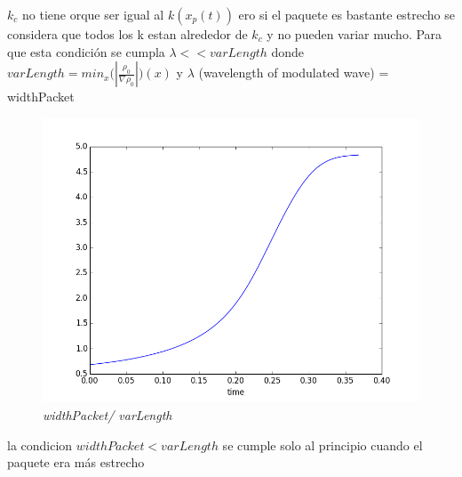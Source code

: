 \documentclass{article}
\begin{document}
\begin{description}
\item $k_c$ no tiene orque ser igual al $k(x_p(t))$ ero si el paquete es bastante estrecho se considera que todos los k estan alrededor de $k_c$  y no pueden variar mucho. Para que esta condición se cumpla $\lambda << varLength$ donde 
$varLength =  min_{x}\big(|\frac{\rho_0}{\nabla \rho_0}|\big)(x) $
y $\lambda$ (wavelength of modulated wave) = widthPacket
\item \begin{figure}[!ht]
 \centering
 \includegraphics[scale=0.3]{wdcl.png}
 \caption{\emph{widthPacket/ varLength}}
\end{figure}
\item la condicion $widthPacket < varLength$ se cumple solo al principio cuando el paquete era más estrecho


\newpage



\end{description}
\end{document}
